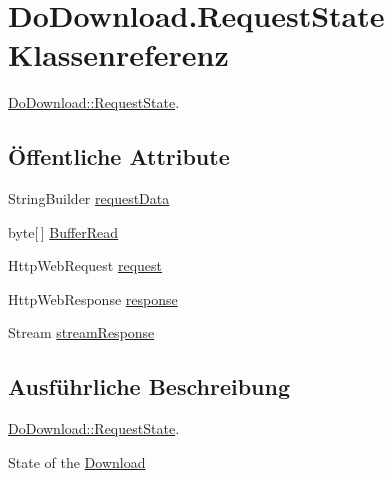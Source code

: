 \hypertarget{class_do_download_1_1_request_state}{\section{Do\-Download.\-Request\-State Klassenreferenz}
\label{class_do_download_1_1_request_state}
}


\hyperlink{class_do_download_1_1_request_state}{Do\-Download\-::\-Request\-State}.  


\subsection*{Öffentliche Attribute}
\begin{DoxyCompactItemize}
\item 
String\-Builder \hyperlink{class_do_download_1_1_request_state_af0c123367214a73fda316c1e53f35c9b}{request\-Data}
\item 
byte\mbox{[}$\,$\mbox{]} \hyperlink{class_do_download_1_1_request_state_aca28c955c588bc3d14b930bd281a7eb8}{Buffer\-Read}
\item 
Http\-Web\-Request \hyperlink{class_do_download_1_1_request_state_a407f724ed70036cffecc6d595e70b3eb}{request}
\item 
Http\-Web\-Response \hyperlink{class_do_download_1_1_request_state_a92511d66202e453392c09341c2f5a3c6}{response}
\item 
Stream \hyperlink{class_do_download_1_1_request_state_acd2b043e223ba326627ebdc03eba740b}{stream\-Response}
\end{DoxyCompactItemize}


\subsection{Ausführliche Beschreibung}
\hyperlink{class_do_download_1_1_request_state}{Do\-Download\-::\-Request\-State}. 

State of the \hyperlink{namespace_download}{Download} 

